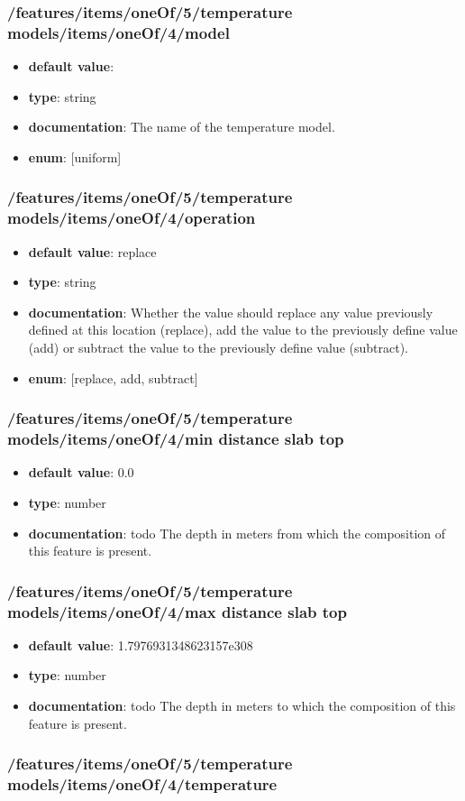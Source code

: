 \subsubsection{/features/items/oneOf/5/temperature models/items/oneOf/4/model}
\begin{itemize}\item {\bf default value}: 
\item {\bf type}: string
\item {\bf documentation}: The name of the temperature model.
\item {\bf enum}: [uniform]\end{itemize}\subsubsection{/features/items/oneOf/5/temperature models/items/oneOf/4/operation}
\begin{itemize}\item {\bf default value}: replace
\item {\bf type}: string
\item {\bf documentation}: Whether the value should replace any value previously defined at this location (replace), add the value to the previously define value (add) or subtract the value to the previously define value (subtract).
\item {\bf enum}: [replace, add, subtract]\end{itemize}\subsubsection{/features/items/oneOf/5/temperature models/items/oneOf/4/min distance slab top}
\begin{itemize}\item {\bf default value}: 0.0
\item {\bf type}: number
\item {\bf documentation}: todo The depth in meters from which the composition of this feature is present.
\end{itemize}\subsubsection{/features/items/oneOf/5/temperature models/items/oneOf/4/max distance slab top}
\begin{itemize}\item {\bf default value}: 1.7976931348623157e308
\item {\bf type}: number
\item {\bf documentation}: todo The depth in meters to which the composition of this feature is present.
\end{itemize}\subsubsection{/features/items/oneOf/5/temperature models/items/oneOf/4/temperature}
